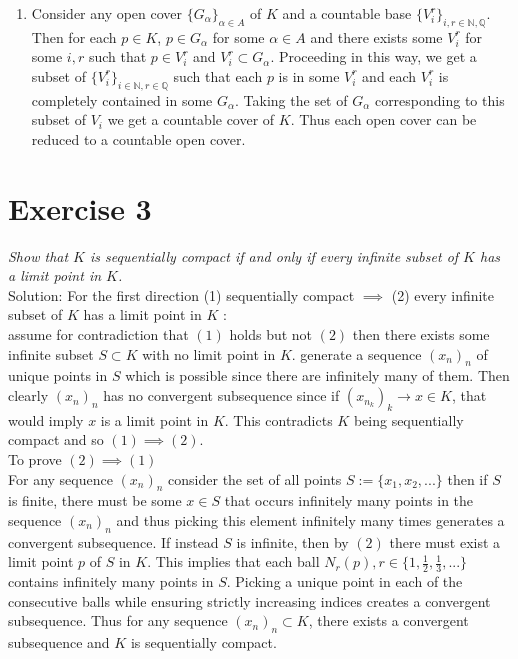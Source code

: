 \documentclass[11pt]{article}
\newcommand{\solution}[1]{{{\textcolor{header}{Solution:} \textcolor{solution}{#1}}}}
\begin{document}
{\begin{enumerate}
     \item Consider any open cover $\{G_\alpha\}_{\alpha\in A}$ of $K$ and a countable base $\{V^{r}_i\}_{i,r \in \mathbb{N}, \mathbb{Q}}$. Then for each $p \in K$,  $p \in G_\alpha$ for some $\alpha \in A$ and there exists some $V_i^{r}$ for some $i,r$ such that $p \in V^{r}_i$ and $V^{r}_i \subset G_\alpha$.
         Proceeding in this way, we get a subset of $\{V_i^{r}\}_{i\in \mathbb{N}, r \in \mathbb{Q}}$ such that each $p$ is in some $V_i^{r}$ and each $V_i^{r}$ is completely contained in some $G_\alpha$.
         Taking the set of $G_\alpha$ corresponding to this subset of $V_i$ we get a countable cover of $K$. Thus each open cover can be reduced to a countable open cover.
    \end{enumerate}
}
\section{Exercise 3}
\emph{
    Show that $K$ is sequentially compact if and only if every infinite subset of $K$ has a limit
    point in $K$.\\
}
\solution{
    For the first direction (1) sequentially compact $\implies$ (2) every infinite subset of $K$ 
    has a limit point in $K$ :\\
    assume for contradiction that $(1)$ holds but not $(2)$ then there exists some infinite subset $S \subset K$ with no limit point in $K$.
    generate a sequence $(x_n)_n$ of unique points in $S$ which is possible since there are infinitely many of them. Then clearly $(x_n)_n$ has
    no convergent subsequence since if $(x_{n_k})_k \rightarrow x \in K$, that would imply $x$ is a limit point in $K$. This contradicts $K$ being sequentially compact and so $(1) \implies (2)$.
    \\
    To prove $(2) \implies (1)$\\
    For any sequence  $(x_n)_n$ consider the set of all points $S := \{x_1,x_2,...\}$ then if $S$ is finite, there must be some $x \in S$ that occurs infinitely many points in the sequence $(x_n)_n$ and thus
    picking this element infinitely many times generates a convergent subsequence. If instead $S$ is infinite, then by $(2)$ there must exist a limit point $p$ of $S$ in $K$. This implies that each ball $N_r(p), r \in \{1,\frac{1}{2},\frac{1}{3},...\}$ contains infinitely
    many points in $S$. Picking a unique point in each of the consecutive balls while ensuring strictly increasing indices creates a convergent subsequence. Thus for any sequence $(x_n)_n \subset K$, there exists a convergent subsequence and $K$ is sequentially compact.
}
\end{document}

